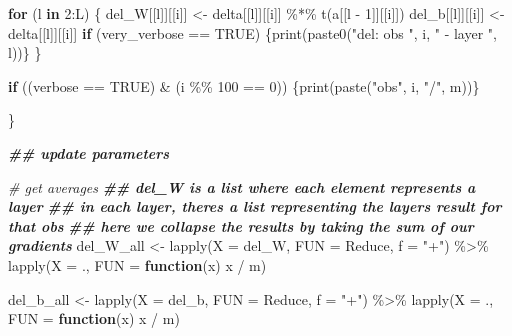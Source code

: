 \documentclass[
]{book}
\newenvironment{Shaded}{\begin{snugshade}}{\end{snugshade}}
\newcommand{\AttributeTok}[1]{\textcolor[rgb]{0.77,0.63,0.00}{#1}}
\newcommand{\CommentTok}[1]{\textcolor[rgb]{0.56,0.35,0.01}{\textit{#1}}}
\newcommand{\ConstantTok}[1]{\textcolor[rgb]{0.00,0.00,0.00}{#1}}
\newcommand{\ControlFlowTok}[1]{\textcolor[rgb]{0.13,0.29,0.53}{\textbf{#1}}}
\newcommand{\DecValTok}[1]{\textcolor[rgb]{0.00,0.00,0.81}{#1}}
\newcommand{\DocumentationTok}[1]{\textcolor[rgb]{0.56,0.35,0.01}{\textbf{\textit{#1}}}}
\newcommand{\FunctionTok}[1]{\textcolor[rgb]{0.00,0.00,0.00}{#1}}
\newcommand{\NormalTok}[1]{#1}
\newcommand{\OtherTok}[1]{\textcolor[rgb]{0.56,0.35,0.01}{#1}}
\newcommand{\SpecialCharTok}[1]{\textcolor[rgb]{0.00,0.00,0.00}{#1}}
\newcommand{\StringTok}[1]{\textcolor[rgb]{0.31,0.60,0.02}{#1}}
\begin{document}
\begin{Shaded}
\begin{Highlighting}[]
    \ControlFlowTok{for}\NormalTok{ (l }\ControlFlowTok{in} \DecValTok{2}\SpecialCharTok{:}\NormalTok{L) \{}
\NormalTok{      del\_W[[l]][[i]] }\OtherTok{\textless{}{-}}\NormalTok{ delta[[l]][[i]] }\SpecialCharTok{\%*\%} \FunctionTok{t}\NormalTok{(a[[l }\SpecialCharTok{{-}} \DecValTok{1}\NormalTok{]][[i]])}
\NormalTok{      del\_b[[l]][[i]] }\OtherTok{\textless{}{-}}\NormalTok{ delta[[l]][[i]]}
      \ControlFlowTok{if}\NormalTok{ (very\_verbose }\SpecialCharTok{==} \ConstantTok{TRUE}\NormalTok{) \{}\FunctionTok{print}\NormalTok{(}\FunctionTok{paste0}\NormalTok{(}\StringTok{"del: obs "}\NormalTok{, i, }\StringTok{" {-} layer "}\NormalTok{, l))\}}
\NormalTok{    \}}
    
    \ControlFlowTok{if}\NormalTok{ ((verbose }\SpecialCharTok{==} \ConstantTok{TRUE}\NormalTok{) }\SpecialCharTok{\&}\NormalTok{ (i }\SpecialCharTok{\%\%} \DecValTok{100} \SpecialCharTok{==} \DecValTok{0}\NormalTok{)) \{}\FunctionTok{print}\NormalTok{(}\FunctionTok{paste}\NormalTok{(}\StringTok{"obs"}\NormalTok{, i, }\StringTok{"/"}\NormalTok{, m))\}}
    
\NormalTok{  \}}
  
  \DocumentationTok{\#\# update parameters}
  
  \CommentTok{\# get averages}
  \DocumentationTok{\#\# del\_W is a list where each element represents a layer}
  \DocumentationTok{\#\# in each layer, there\textquotesingle{}s a list representing the layer\textquotesingle{}s result for that obs}
  \DocumentationTok{\#\# here we collapse the results by taking the sum of our gradients}
\NormalTok{  del\_W\_all }\OtherTok{\textless{}{-}} \FunctionTok{lapply}\NormalTok{(}\AttributeTok{X =}\NormalTok{ del\_W,}
                      \AttributeTok{FUN =}\NormalTok{ Reduce,}
                      \AttributeTok{f =} \StringTok{"+"}\NormalTok{) }\SpecialCharTok{\%\textgreater{}\%}
    \FunctionTok{lapply}\NormalTok{(}\AttributeTok{X =}\NormalTok{ .,}
           \AttributeTok{FUN =} \ControlFlowTok{function}\NormalTok{(x) x }\SpecialCharTok{/}\NormalTok{ m)}
  
\NormalTok{  del\_b\_all }\OtherTok{\textless{}{-}} \FunctionTok{lapply}\NormalTok{(}\AttributeTok{X =}\NormalTok{ del\_b,}
                      \AttributeTok{FUN =}\NormalTok{ Reduce,}
                      \AttributeTok{f =} \StringTok{"+"}\NormalTok{) }\SpecialCharTok{\%\textgreater{}\%}
    \FunctionTok{lapply}\NormalTok{(}\AttributeTok{X =}\NormalTok{ .,}
           \AttributeTok{FUN =} \ControlFlowTok{function}\NormalTok{(x) x }\SpecialCharTok{/}\NormalTok{ m)}
  

\end{Highlighting}
\end{Shaded}
\end{document}

